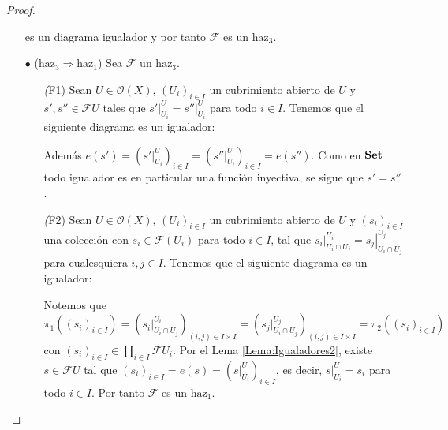\documentclass[letterpaper]{article} %
\newcommand{\Set}{\normalfont{\textbf{Set}}}
\begin{document}
\begin{proof}
\begin{itemize}
            
            es un diagrama igualador y por tanto $\mathscr{F}$ es un ${\text{haz}}_3$.
         \item[$\bullet$](${\text{haz}}_3\Rightarrow {\text{haz}}_1$) Sea $\mathscr{F}$ un ${\text{haz}}_3$.
            \begin{itemize}
               \item[\textit(F1)] Sean $U\in \mathcal{O}(X)$, $\left( U_i\right)_{i\in I}$ un cubrimiento abierto de $U$ y $s',s''\in \mathscr{F}U$ tales que $\left.s'\right|^U_{U_i}=\left.s''\right|^U_{U_i}$ para todo $i\in I$. Tenemos que el siguiente diagrama es un igualador:
                  
                  Además $e(s')=\left( \left. s'\right|^U_{U_i}\right)_{i\in I}=\left( \left. s''\right|^U_{U_i}\right)_{i\in I}=e(s'')$. Como en $\Set$ todo igualador es en particular una función inyectiva, se sigue que $s'=s''$.
               \item[\textit(F2)] Sean $U\in \mathcal{O}(X)$, $\left( U_i\right)_{i\in I}$ un cubrimiento abierto de $U$ y $\left( s_i\right)_{i\in I}$ una colección con $s_i\in \mathscr{F}(U_i)$ para todo $i\in I$, tal que $\left. s_i\right|^{U_i}_{U_i \cap U_j}=\left.s_j\right|^{U_j}_{U_i\cap U_j}$ para cualesquiera $i,j\in I$. Tenemos que el siguiente diagrama es un igualador:
                  
                  Notemos que $\pi_1\left( \left( s_i\right)_{i\in I}\right)=\left( s_i|^{U_i}_{U_i\cap U_j}\right)_{(i,j)\in I\times I}=\left( s_j|^{U_j}_{U_i\cap U_j}\right)_{(i,j)\in I\times I}=\pi_2\left( \left( s_i\right)_{i\in I}\right)$ con $\left( s_i\right)_{i\in I}\in \prod_{i\in I}\mathscr{F}U_i$. Por el Lema \ref{Lema:Igualadores2}, existe $s\in \mathscr{F}U$ tal que $\left( s_i\right)_{i\in I}=e(s)=\left( \left.s\right|^U_{U_i}\right)_{i\in I}$, es decir, $\left.s\right|^U_{U_i}=s_i$ para todo $i\in I$. Por tanto $\mathscr{F}$ es un ${\text{haz}}_1$.

            \end{itemize}
      \end{itemize}
   \end{proof}

   \newpage
   \nocite{*}
   
   
\end{document}
